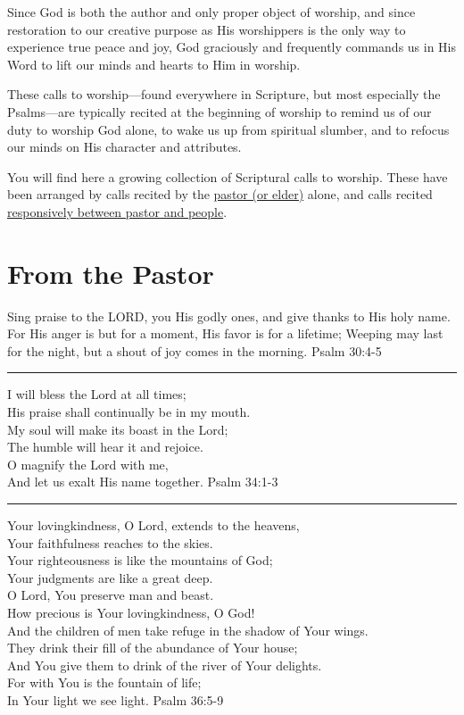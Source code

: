 \documentclass[]{book}
\begin{document}
Since God is both the author and only proper object of worship, and
since restoration to our creative purpose as His worshippers is the only
way to experience true peace and joy, God graciously and frequently
commands us in His Word to lift our minds and hearts to Him in worship.

These calls to worship---found everywhere in Scripture, but most
especially the Psalms---are typically recited at the beginning of
worship to remind us of our duty to worship God alone, to wake us up
from spiritual slumber, and to refocus our minds on His character and
attributes.

You will find here a growing collection of Scriptural calls to worship.
These have been arranged by calls recited by the
\protect\hyperlink{from-the-fastor}{pastor (or elder)} alone, and calls
recited \protect\hyperlink{responsive-calls}{responsively between pastor
and people}.

\section*{From the Pastor}\label{from-the-pastor}

Sing praise to the LORD, you His godly ones, and give thanks to His holy
name. For His anger is but for a moment, His favor is for a lifetime;
Weeping may last for the night, but a shout of joy comes in the morning.
\textbar{} Psalm 30:4-5

\begin{center}\rule{0.5\linewidth}{\linethickness}\end{center}

I will bless the Lord at all times;\\
His praise shall continually be in my mouth.\\
My soul will make its boast in the Lord;\\
The humble will hear it and rejoice.\\
O magnify the Lord with me,\\
And let us exalt His name together. \textbar{} Psalm 34:1-3

\begin{center}\rule{0.5\linewidth}{\linethickness}\end{center}

Your lovingkindness, O Lord, extends to the heavens,\\
Your faithfulness reaches to the skies.\\
Your righteousness is like the mountains of God;\\
Your judgments are like a great deep.\\
O Lord, You preserve man and beast.\\
How precious is Your lovingkindness, O God!\\
And the children of men take refuge in the shadow of Your wings.\\
They drink their fill of the abundance of Your house;\\
And You give them to drink of the river of Your delights.\\
For with You is the fountain of life;\\
In Your light we see light. \textbar{} Psalm 36:5-9
\end{document}
